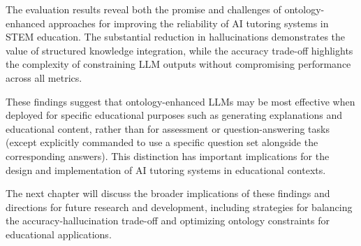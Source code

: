 The evaluation results reveal both the promise and challenges of ontology-enhanced approaches for improving the reliability of AI tutoring systems in STEM education. The substantial reduction in hallucinations demonstrates the value of structured knowledge integration, while the accuracy trade-off highlights the complexity of constraining LLM outputs without compromising performance across all metrics.

These findings suggest that ontology-enhanced LLMs may be most effective when deployed for specific educational purposes such as generating explanations and educational content, rather than for assessment or question-answering tasks (except explicitly commanded to use a specific question set alongside the corresponding answers). This distinction has important implications for the design and implementation of AI tutoring systems in educational contexts.

The next chapter will discuss the broader implications of these findings and directions for future research and development, including strategies for balancing the accuracy-hallucination trade-off and optimizing ontology constraints for educational applications.